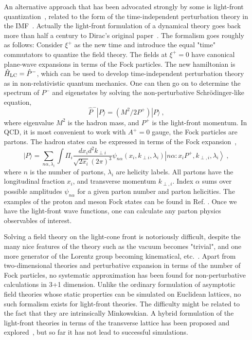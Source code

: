 An alternative approach that has been advocated strongly by some is light-front
quantization~\cite{Ji:1992ku,Burkardt:1995ct,Brodsky:1997de},
related to the form of the time-independent perturbation theory in
the IMF~\cite{Weinberg:1966jm}. Actually the light-front formulation of a dynamical theory goes back
more than half a century to Dirac's original paper~\cite{Dirac:1949cp}.
The formalism goes roughly as follows: Consider $\xi^+$ as the new time and introduce the equal "time"
commutators to quantize the field theory. The fields at $\xi^+=0$ have canonical plane-wave expansions in terms of
the Fock particles. The new hamiltonian is $\hat H_{\rm LC}= \hat P^-$, which
can be used to develop time-independent perturbation theory as in non-relativistic quantum mechanics.  One can then go on
to determine the spectrum of $P^-$ and eigenstates by solving the non-perturbative Schr\"odinger-like equation,
\begin{equation}
      \hat P^-|P\rangle = (M^2/2P^+)|P\rangle \ ,
\end{equation}
where eigenvalue $M^2$ is the hadron mass, and $P^+$ is the light-front momentum.
In QCD, it is most convenient to work with $A^+=0$ gauge, the Fock particles are partons.
The hadron states can be expressed in terms of the Fock expansion~\cite{Brodsky:1997de},
\begin{equation}
             |P\rangle = \sum_{n\alpha, \lambda_i} \int \Pi_i \frac{dx_id^2k_{\perp i}}{\sqrt{2x_i}(2\pi)^3} \psi_{n\alpha}(x_i, k_{\perp i}, \lambda_i) \left|n\alpha
             : x_iP^+, k_{\perp,i},\lambda_i \right\rangle \ ,
\end{equation}
where $n$ is the number of partons, $\lambda_i$ are helicity labels. All partons have the longitudinal fraction $x_i$,
and transverse momentum $k_{\perp, i}$. Index $\alpha$ sums over possible amplitudes $\psi_{n\alpha}$ for a given parton number and
parton helicities. The examples of the proton and meson Fock states can be found in Ref. \cite{Ji:2002xn,Ji:2003yj}.
Once we have the light-front wave functions, one can calculate any parton physics observables of interest.

Solving a field theory on the light-cone front is notoriously difficult, despite the many nice features of the theory
such as the vacuum becomes "trivial", and one more generator of the Lorentz group
becoming kinematical, etc.~\cite{Brodsky:1997de}. Apart from two-dimensional theories and
perturbative expansion in terms of the number of Fock particles, no systematic
approximation has been found for non-perturbative calculations in 3+1 dimension. Unlike the ordinary
formulation of asymptotic field theories whose static properties can be simulated on Euclidean lattices,
no such formalism exists for light-front theories. The difficulty might be related to the fact that they
are intrinsically Minkowskian. A hybrid formulation of
the light-front theories in terms of the transverse lattice has been proposed and explored~\cite{Bardeen:1979xx},
but so far it has not lead to successful simulations.

